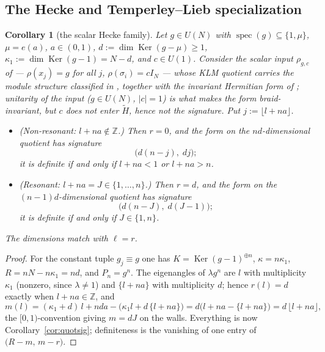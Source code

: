 \documentclass[11pt]{article}
\newtheorem{corollary}[theorem]{Corollary}
\theoremstyle{definition}
\newcommand{\Z}{\mathbb Z}
\newcommand{\Ht}{\widetilde H}
\newcommand{\Ker}{\operatorname{Ker}}
\newcommand{\frc}[1]{\{#1\}}
\begin{document}
\subsection{The Hecke and Temperley--Lieb specialization}\label{sec:hecke}

\begin{corollary}[the scalar Hecke family]\label{cor:hecke}
Let $g\in U(N)$ with $\operatorname{spec}(g)\subseteq\{1,\mu\}$,
$\mu=e(a)$, $a\in(0,1)$, $d:=\dim\Ker(g-\mu)\ge1$,
$\kappa_1:=\dim\Ker(g-1)=N-d$, and $c\in U(1)$. Consider the scalar input
$\rho_{g,c}$ of \cite[Lem.~4.1]{N-Hecke}
--- $\rho(x_j)=g$ for all $j$, $\rho(\sigma_i)=cI_N$ --- whose KLM
quotient carries the module structure classified in
\cite[Thm.~4.4]{N-Hecke}, together with the invariant Hermitian form of
\cite[\S5]{N-KLM}; unitarity of the input ($g\in U(N)$, $\lvert
c\rvert=1$) is what makes the form braid-invariant, but $c$ does not
enter $\Ht$, hence not the signature. Put $j:=\lfloor l+na\rfloor$.
\begin{itemize}
\item[(i)] (Non-resonant: $l+na\notin\Z$.) Then $r=0$, and the form
on the $nd$-dimensional quotient has signature
\[
\bigl(d(n-j),\;dj\bigr);
\]
it is definite if and only if $l+na<1$ or $l+na>n$.
\item[(ii)] (Resonant: $l+na=J\in\{1,\dots,n\}$.) Then $r=d$, and the
form on the $(n-1)d$-dimensional quotient has signature
\[
\bigl(d(n-J),\;d(J-1)\bigr);
\]
it is definite if and only if $J\in\{1,n\}$.
\end{itemize}
The dimensions match \cite[Thm.~4.4(i)]{N-Hecke} with $\ell=r$.
\end{corollary}

\begin{proof}
For the constant tuple $g_j\equiv g$ one has
$K=\Ker(g-1)^{\oplus n}$, $\kappa=n\kappa_1$, $R=nN-n\kappa_1=nd$, and $P_n=g^{n}$.
The eigenangles of $\lambda g^{n}$ are $l$ with multiplicity $\kappa_1$
(nonzero, since $\lambda\neq1$) and $\frc{l+na}$ with multiplicity
$d$; hence $r(l)=d$ exactly when $l+na\in\Z$, and
\[
m(l)=(\kappa_1+d)\,l+nda-\bigl(\kappa_1l+d\,\frc{l+na}\bigr)
=d\bigl(l+na-\frc{l+na}\bigr)=d\,\lfloor l+na\rfloor ,
\]
the $[0,1)$-convention giving $m=dJ$ on the walls. Everything is now
Corollary~\ref{cor:quotsig}; definiteness is the vanishing of one
entry of $\bigl(R-m,\,m-r\bigr)$.
\end{proof}
\end{document}
